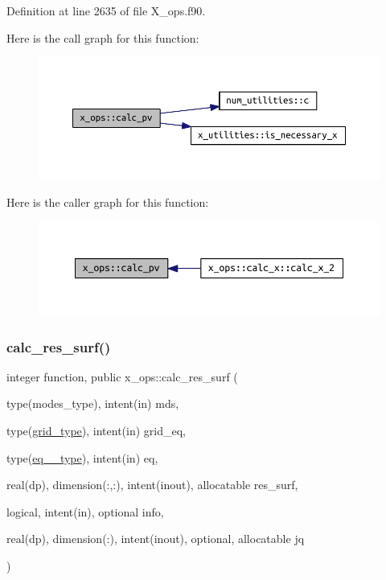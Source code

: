 Definition at line 2635 of file X\+\_\+ops.\+f90.

Here is the call graph for this function\+:\nopagebreak
\begin{figure}[H]
\begin{center}
\leavevmode
\includegraphics[width=350pt]{namespacex__ops_a51f3bf0b4c8d688ffbcc3a1adbca9762_cgraph}
\end{center}
\end{figure}
Here is the caller graph for this function\+:\nopagebreak
\begin{figure}[H]
\begin{center}
\leavevmode
\includegraphics[width=350pt]{namespacex__ops_a51f3bf0b4c8d688ffbcc3a1adbca9762_icgraph}
\end{center}
\end{figure}
\mbox{\label{namespacex__ops_a1a90026bbbeddc25e82cfdd304df251f}} 
\subsubsection{\texorpdfstring{calc\+\_\+res\+\_\+surf()}{calc\_res\_surf()}}
{\footnotesize\ttfamily integer function, public x\+\_\+ops\+::calc\+\_\+res\+\_\+surf (\begin{DoxyParamCaption}\item[{type(modes\+\_\+type), intent(in)}]{mds,  }\item[{type(\hyperlink{structgrid__vars_1_1grid__type}{grid\+\_\+type}), intent(in)}]{grid\+\_\+eq,  }\item[{type(\hyperlink{structeq__vars_1_1eq__1__type}{eq\+\_\+1\+\_\+type}), intent(in)}]{eq,  }\item[{real(dp), dimension(\+:,\+:), intent(inout), allocatable}]{res\+\_\+surf,  }\item[{logical, intent(in), optional}]{info,  }\item[{real(dp), dimension(\+:), intent(inout), optional, allocatable}]{jq }\end{DoxyParamCaption})}



